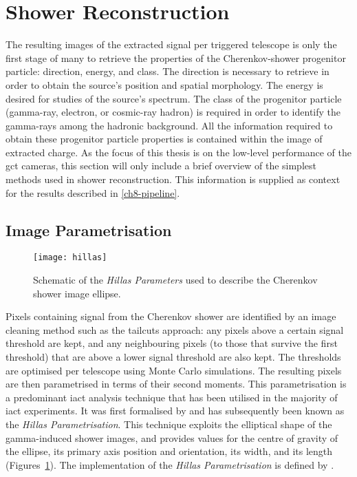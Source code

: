 \section{Shower Reconstruction}

The resulting images of the extracted signal per triggered telescope is only the first stage of many to retrieve the properties of the Cherenkov-shower progenitor particle: direction, energy, and class. The direction is necessary to retrieve in order to obtain the source's position and spatial morphology. The energy is desired for studies of the source's spectrum. The class of the progenitor particle (gamma-ray, electron, or cosmic-ray hadron) is required in order to identify the gamma-rays among the hadronic background. All the information required to obtain these progenitor particle properties is contained within the image of extracted charge. As the focus of this thesis is on the low-level performance of the \gls{gct} cameras, this section will only include a brief overview of the simplest methods used in shower reconstruction. This information is supplied as context for the results described in \ref{ch8-pipeline}.

\subsection{Image Parametrisation} \label{section:image_parametrisation}

\begin{figure}
	\centering
    \texttt{[image: hillas]} 
	\caption[Hillas Parametrisation Schematic.]{Schematic of the \textit{Hillas Parameters} used to describe the Cherenkov shower image ellipse.}
	\label{fig:hillas}
\end{figure}

Pixels containing signal from the Cherenkov shower are identified by an image cleaning method such as the tailcuts approach: any pixels above a certain signal threshold are kept, and any neighbouring pixels (to those that survive the first threshold) that are above a lower signal threshold are also kept. The thresholds are optimised per telescope using Monte Carlo simulations. The resulting pixels are then parametrised in terms of their second moments. This parametrisation is a predominant \gls{iact} analysis technique that has been utilised in the majority of \gls{iact} experiments. It was first formalised by \textcite{Hillas1985a} and has subsequently been known as the \textit{Hillas Parametrisation}. This technique exploits the elliptical shape of the gamma-induced shower images, and provides values for the centre of gravity of the ellipse, its primary axis position and orientation, its width, and its length (Figures~\ref{fig:hillas}). The  implementation of the \textit{Hillas Parametrisation} is defined by \textcite{Reynolds1993}.

